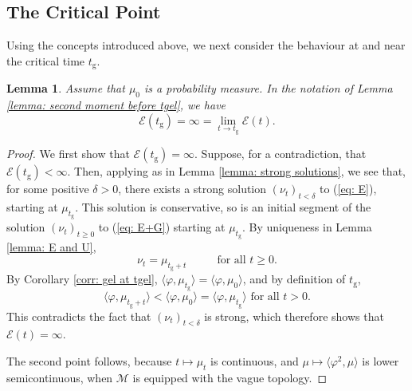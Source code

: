 \documentclass[11pt, notitlepage]{article}
\newtheorem{lem}[thm]{Lemma}
\begin{document}
\subsection{\textbf{The Critical Point}} Using the concepts introduced above, we next consider the behaviour at and near the critical time $t_\mathrm{g}$. \begin{lem} Assume that $\mu_0$ is a probability measure. In the notation of Lemma \ref{lemma: second moment before tgel}, we have \begin{equation} \mathcal{E}(t_\mathrm{g})=\infty=\lim_{t\rightarrow t_\mathrm{g}} \mathcal{E}(t). \end{equation} \end{lem} 
\begin{proof}We first show that $\mathcal{E}(t_\mathrm{g})=\infty$. Suppose, for a contradiction, that $\mathcal{E}(t_\mathrm{g})<\infty.$ Then, applying \cite[Proposition 2.7]{N00} as in Lemma \ref{lemma: strong solutions}, we see that, for some positive $\delta>0$, there exists a strong solution $(\nu_t)_{t<\delta}$ to (\ref{eq: E}), starting at $\mu_{t_\mathrm{g}}.$ This solution is conservative, so is an initial segment of the solution $(\nu_t)_{t\ge 0}$ to (\ref{eq: E+G}) starting at $\mu_{ t_\mathrm{g}}$. By uniqueness in Lemma \ref{lemma: E and U}, \begin{equation}
    \nu_t=\mu_{t_\mathrm{g}+t} \hspace{1cm} \text{ for all }t\ge 0.
\end{equation}
By Corollary \ref{corr: gel at tgel}, $\langle \varphi, \mu_{t_\mathrm{g}}\rangle = \langle \varphi, \mu_0\rangle$, and by definition of $t_\mathrm{g}$, \begin{equation} \langle \varphi, \mu_{t_\mathrm{g}+t}\rangle < \langle \varphi, \mu_{0}\rangle = \langle \varphi, \mu_{t_\mathrm{g}}\rangle \text{ for all }t>0. \end{equation}This contradicts the fact that $(\nu_t)_{t<\delta}$ is strong, which therefore shows that $\mathcal{E}(t)=\infty$.

The second point follows, because $t\mapsto \mu_t$ is continuous, and $\mu \mapsto \langle \varphi^2, \mu\rangle$ is lower semicontinuous, when $\mathcal{M}$
is equipped with the vague topology. \end{proof}
\end{document}
